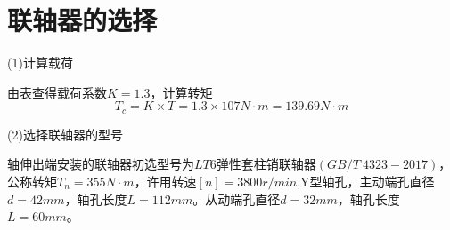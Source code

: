 \section{联轴器的选择}
(1)计算载荷

由表查得载荷系数$K=1.3$，计算转矩
\begin{equation}
    T_c = K\times T=1.3\times 107N\cdot m = 139.69N\cdot m
\end{equation}

(2)选择联轴器的型号

轴伸出端安装的联轴器初选型号为$LT6$弹性套柱销联轴器$(GB/T~4323-2017)$，公称转矩$T_n = 355N\cdot m$，许用转速$[n]=3800r/min$,Y型轴孔，主动端孔直径$d=42mm$，轴孔长度$L=112mm$。从动端孔直径$d=32mm$，轴孔长度$L=60mm$。